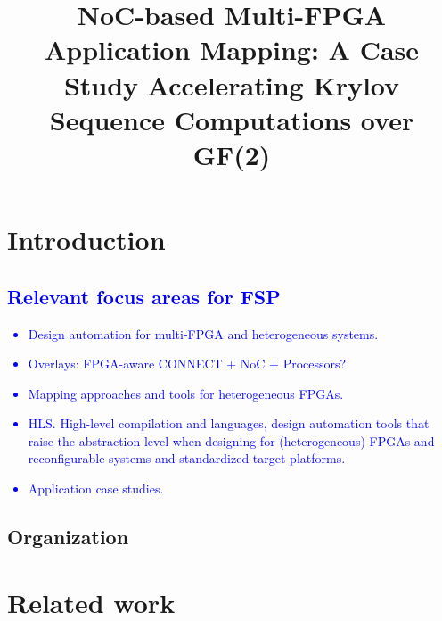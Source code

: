 \documentclass[conference, 9pt]{IEEEtran}
\newcommand{\blue}[1]{\textcolor{blue}{#1}}
\begin{document}
 

\title{NoC-based Multi-FPGA Application Mapping: A Case Study Accelerating Krylov Sequence Computations over GF(2)}
\maketitle 

\begin{abstract}

\end{abstract}


\section{Introduction}


\blue{
\subsection{Relevant focus areas for FSP}
\begin{itemize}
\item Design automation for multi-FPGA and heterogeneous systems.
 \item Overlays: FPGA-aware CONNECT\cite{papamichael2012connect}  + NoC + Processors?
 \item Mapping approaches and tools for heterogeneous FPGAs.
 \item HLS. High-level compilation and languages, design automation tools that 
raise the abstraction level when designing for (heterogeneous) FPGAs and 
reconfigurable systems and standardized target platforms. 
 \item Application case studies.
\end{itemize}
}
\subsection{Organization}
\section{Related work}
\label{S:related}
\end{document}
